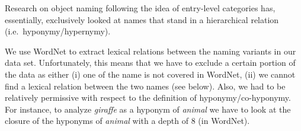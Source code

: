 \begin{table}


\caption{Lexical relations between naming variants in WN and the VG name according to WordNet}
\label{tab:rel}
\end{table}


Research on object naming following the idea of entry-level categories has, essentially, exclusively looked at names that stand in a hierarchical relation (i.e.\ hyponymy/hypernymy).

We use WordNet to extract lexical relations between the naming variants in our data set.
Unfortunately, this means that we have to exclude a certain portion of the data as either (i) one of the name is not covered in WordNet, (ii) we cannot find a lexical relation between the two names (see below). Also, we had to be relatively permissive with respect to the definition of hyponymy/co-hyponymy. 
For instance, to analyze \textit{giraffe} as a hyponym of \textit{animal} we have to look at the closure of the hyponyms of \textit{animal} with a depth of 8 (in WordNet).

